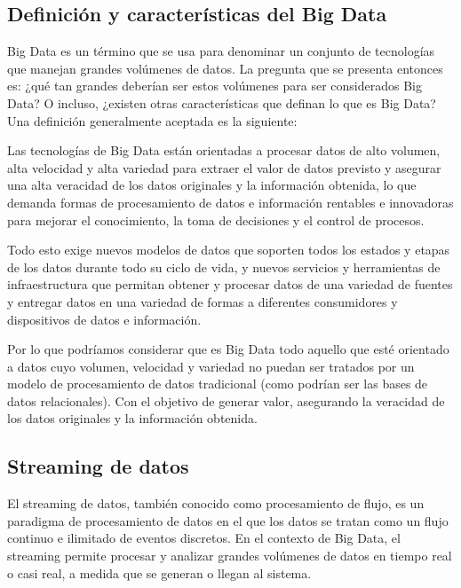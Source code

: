 \newpage
\subsection{Definición y características del Big Data}

Big Data es un término que se usa para denominar un conjunto de tecnologías que manejan grandes volúmenes de datos.
La pregunta que se presenta entonces es: ¿qué tan grandes deberían ser estos volúmenes para ser considerados Big Data?
O incluso, ¿existen otras características que definan lo que es Big Data?
Una definición generalmente aceptada es la siguiente:
\bigskip

Las tecnologías de Big Data están orientadas a
procesar datos de alto volumen, alta velocidad y alta variedad
para extraer el valor de datos previsto y asegurar una alta
veracidad de los datos originales y la información obtenida, lo que demanda
formas de procesamiento de datos e información rentables e innovadoras
para mejorar el conocimiento, la toma de decisiones y el control de procesos. \newline

Todo esto exige nuevos modelos de datos
que soporten todos los estados y etapas de los datos durante todo su ciclo de vida, 
y nuevos servicios y herramientas de infraestructura que permitan obtener y procesar
datos de una variedad de fuentes y
entregar datos en una variedad de formas a diferentes consumidores y dispositivos
de datos e información. \parencite{demchenko2014addressing}

\newpage
Por lo que podríamos considerar que es Big Data todo aquello que esté orientado a datos
cuyo volumen, velocidad y variedad no puedan ser tratados por un modelo de procesamiento
de datos tradicional (como podrían ser las bases de datos relacionales). Con el objetivo
de generar valor, asegurando la veracidad de los datos originales y la información obtenida.

\subsection{Streaming de datos}

El streaming de datos, también conocido como procesamiento de flujo, es un paradigma 
de procesamiento de datos en el que los datos se tratan como un flujo continuo e 
ilimitado de eventos discretos. En el contexto de Big Data, el streaming permite procesar 
y analizar grandes volúmenes de datos en tiempo real o casi real, a medida que se generan 
o llegan al sistema. \parencite{flink}

